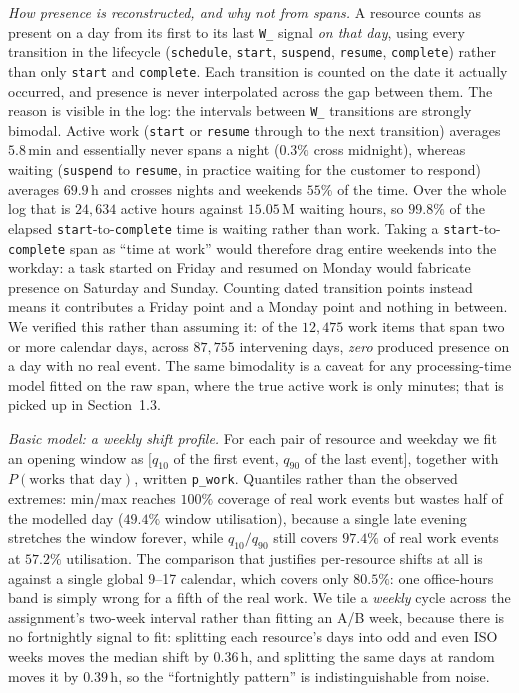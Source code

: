 \emph{How presence is reconstructed, and why not from spans.} A resource counts
as present on a day from its first to its last \texttt{W\_} signal \emph{on
that day}, using every transition in the lifecycle (\texttt{schedule},
\texttt{start}, \texttt{suspend}, \texttt{resume}, \texttt{complete}) rather
than only \texttt{start} and \texttt{complete}. Each transition is counted on
the date it actually occurred, and presence is never interpolated across the
gap between them. The reason is visible in the log: the intervals between
\texttt{W\_} transitions are strongly bimodal. Active work (\texttt{start} or
\texttt{resume} through to the next transition) averages $5.8$\,min and
essentially never spans a night ($0.3\%$ cross midnight), whereas waiting
(\texttt{suspend} to \texttt{resume}, in practice waiting for the customer to
respond) averages $69.9$\,h and crosses nights and weekends $55\%$ of the time.
Over the whole log that is $24{,}634$ active hours against $15.05$\,M waiting
hours, so $99.8\%$ of the elapsed \texttt{start}-to-\texttt{complete} time is
waiting rather than work. Taking a \texttt{start}-to-\texttt{complete} span as
``time at work'' would therefore drag entire weekends into the workday: a task
started on Friday and resumed on Monday would fabricate presence on Saturday
and Sunday. Counting dated transition points instead means it contributes a
Friday point and a Monday point and nothing in between. We verified this rather
than assuming it: of the $12{,}475$ work items that span two or more calendar
days, across $87{,}755$ intervening days, \emph{zero} produced presence on a
day with no real event. The same bimodality is a caveat for any
processing-time model fitted on the raw span, where the true active work is
only minutes; that is picked up in Section~1.3.

\emph{Basic model: a weekly shift profile.} For each pair of resource and
weekday we fit an opening window as $[q_{10}$ of the first event, $q_{90}$ of
the last event$]$, together with $P(\text{works that day})$, written
\texttt{p\_work}. Quantiles rather than the observed extremes: min/max reaches
$100\%$ coverage of real work events but wastes half of the modelled day
($49.4\%$ window utilisation), because a single late evening stretches the
window forever, while $q_{10}/q_{90}$ still covers $97.4\%$ of real work events
at $57.2\%$ utilisation. The comparison that justifies per-resource shifts at
all is against a single global 9--17 calendar, which covers only $80.5\%$: one
office-hours band is simply wrong for a fifth of the real work. We tile a
\emph{weekly} cycle across the assignment's two-week interval rather than
fitting an A/B week, because there is no fortnightly signal to fit: splitting
each resource's days into odd and even ISO weeks moves the median shift by
$0.36$\,h, and splitting the same days at random moves it by $0.39$\,h, so the
``fortnightly pattern'' is indistinguishable from noise.

